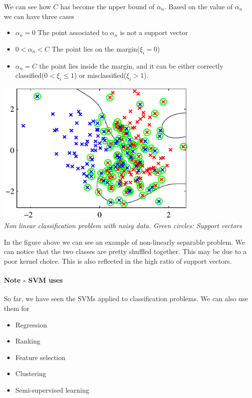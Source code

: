 \documentclass[../main.tex]{subfiles}
\begin{document}
We can see how $C$ has become the upper bound of $\alpha_n$. Based on the value of $\alpha_n$ we can have three cases
\begin{itemize}
    \item $\alpha_n = 0$ The point associated to $\alpha_n$ is not a support vector
    \item $0 < \alpha_n < C$ The point lies on the margin($\xi_i = 0$)
    \item $\alpha_n = C$ the point lies inside the margin, and it can be either correctly classified($0 < \xi_i \leq 1$) or misclassified($\xi_i > 1$)\footnotemark. 
\end{itemize}
\begin{center}
    \includegraphics[width=100mm]{images/SVM_Noisy.PNG} \\
    \textit{Non linear classification problem with noisy data. Green circles: Support vectors}\\
\end{center}
In the figure above we can see an example of non-linearly separable problem. We can notice that the two classes are pretty shuffled together. This may be due to a poor kernel choice. This is also reflected in the high ratio of support vectors.
\paragraph{Note - SVM uses} So far, we have seen the SVMs applied to classification problems. We can also use them for
\begin{itemize}
    \item Regression
    \item Ranking
    \item Feature selection
    \item Clustering
    \item Semi-supervised learning
\end{itemize}

\newpage
\end{document}
